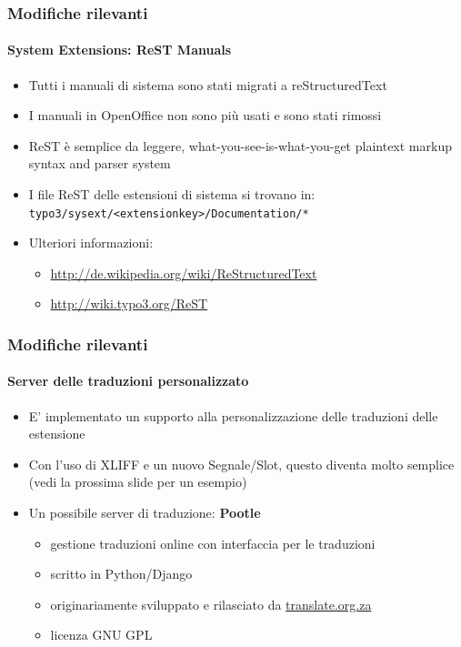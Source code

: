 \begin{frame}[fragile]
	\frametitle{Modifiche rilevanti}
	\framesubtitle{System Extensions: ReST Manuals}

	\begin{itemize}
		\item Tutti i manuali di sistema sono stati migrati a reStructuredText
		\item I manuali in OpenOffice non sono più usati e sono stati rimossi
		\item ReST è semplice da leggere, what-you-see-is-what-you-get plaintext markup syntax and parser system
		\item I file ReST delle estensioni di sistema si trovano in:\newline
			\texttt{typo3/sysext/<extensionkey>/Documentation/*}

		\item Ulteriori informazioni:

			\begin{itemize}
				\item \url{http://de.wikipedia.org/wiki/ReStructuredText}
				\item \url{http://wiki.typo3.org/ReST}
			\end{itemize}

	\end{itemize}

\end{frame}


\begin{frame}[fragile]
	\frametitle{Modifiche rilevanti}
	\framesubtitle{Server delle traduzioni personalizzato}

	\begin{itemize}
		\item E' implementato un supporto alla personalizzazione delle traduzioni delle estensione
		\item Con l'uso di XLIFF e un nuovo Segnale/Slot,\newline
			questo diventa molto semplice (vedi la prossima slide per un esempio)
		\item Un possibile server di traduzione: \textbf{Pootle}

			\begin{itemize}
				\item gestione traduzioni online con interfaccia per le traduzioni
				\item scritto in Python/Django
				\item originariamente sviluppato e rilasciato da \url{translate.org.za}
				\item licenza GNU GPL
			\end{itemize}

	\end{itemize}

\end{frame}

